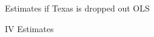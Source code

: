 Estimates if Texas is dropped out
OLS
\begin{stlog}\end{stlog}
IV Estimates
\begin{stlog}\end{stlog}
